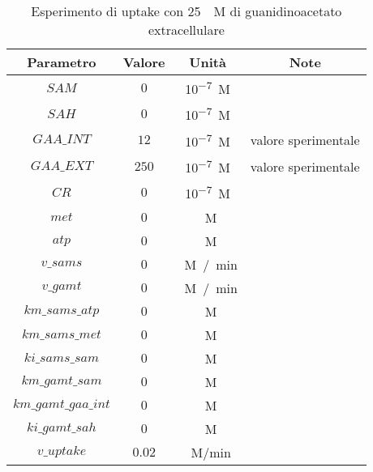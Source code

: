 \begin{table}[H]
	\centering
	\begin{tabular}{| c | c | c | c |}
	\hline
	Parametro & Valore & Unit\`a & Note \\
		\hline
		$SAM$ & $0$ & \si{10^{-7} M} & \\
		\hline
		$SAH$ & $0$ & \si{10^{-7} M} & \\
		\hline
		$GAA\_INT$ & $12$ & \si{10^{-7} M} & valore sperimentale \\
		\hline
		$GAA\_EXT$ & $250$ & \si{10^{-7} M} & valore sperimentale \\
		\hline
		$CR$ & $0$ & \si{10^{-7} M} & \\
		\hline
		$met$ & $0$ & \si{\mu M} & \\
		\hline
		$atp$ & $0$ & \si{\mu M} & \\
		\hline
		$v\_sams$ & $0$ & \si{\mu M / min} & \\
		\hline
		$v\_gamt$ & $0$ & \si{\mu M / min} & \\
		\hline
		$km\_sams\_atp$ & $0$ & \si{\mu M} & \\
		\hline
		$km\_sams\_met$ & $0$ & \si{\mu M} & \\
		\hline
		$ki\_sams\_sam$ & $0$ & \si{\mu M} & \\
		\hline
		$km\_gamt\_sam$ & $0$ & \si{\mu M} & \\
		\hline
		$km\_gamt\_gaa\_int$ & $0$ & \si{\mu M} & \\
		\hline
		$ki\_gamt\_sah$ & $0$ & \si{\mu M} & \\
		\hline
		$v\_uptake$ & $0.02$ & \si{\mu M/min} & \\
		\hline
	\end{tabular}
	\caption{Esperimento di uptake con \SI{25}{\mu M} di guanidinoacetato extracellulare}
	\label{mod:2}
\end{table}


